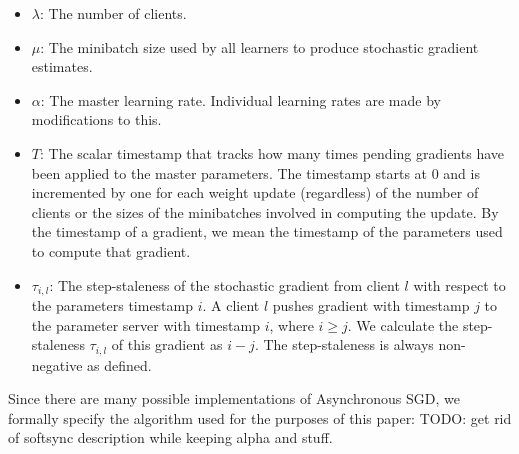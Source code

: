 \documentclass{article} %
\begin{document}
\begin{itemize}
  \item $\lambda$: The number of clients.
  \item $\mu$: The minibatch size used by all learners to produce stochastic gradient estimates.
  \item $\alpha$: The master learning rate. Individual learning rates are made by modifications to this.
  \item $T$: The scalar timestamp that tracks how many times pending gradients have been applied to the
    master parameters. The timestamp starts at 0 and is incremented by one for each weight update (regardless)
    of the number of clients or the sizes of the minibatches involved in computing the update. By the timestamp
    of a gradient, we mean the timestamp of the parameters used to compute that gradient.
  \item $\tau_{i,l}$: The step-staleness of the stochastic gradient from client $l$ with respect to the parameters timestamp
    $i$. A client $l$ pushes gradient with timestamp $j$ to the parameter server with timestamp $i$, where $i \geq j$.
    We calculate the step-staleness $\tau_{i,l}$ of this gradient as $i−j$.
    The step-staleness is always non-negative as defined.
\end{itemize}

Since there are many possible implementations of Asynchronous SGD, we formally specify the algorithm used for
the purposes of this paper:
TODO: get rid of softsync description while keeping alpha and stuff.
\end{document}
